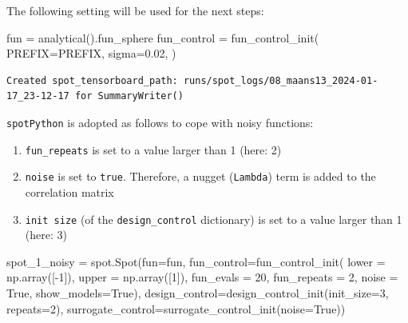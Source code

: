 \documentclass[
  letterpaper,
  DIV=11,
  numbers=noendperiod]{scrreprt}
\newenvironment{Shaded}{\begin{snugshade}}{\end{snugshade}}
\newcommand{\DecValTok}[1]{\textcolor[rgb]{0.68,0.00,0.00}{#1}}
\newcommand{\FloatTok}[1]{\textcolor[rgb]{0.68,0.00,0.00}{#1}}
\newcommand{\NormalTok}[1]{\textcolor[rgb]{0.00,0.23,0.31}{#1}}
\newcommand{\OperatorTok}[1]{\textcolor[rgb]{0.37,0.37,0.37}{#1}}
\newcommand{\VariableTok}[1]{\textcolor[rgb]{0.07,0.07,0.07}{#1}}
\providecommand{\tightlist}{%
  \setlength{\itemsep}{0pt}\setlength{\parskip}{0pt}}\usepackage{longtable,booktabs,array}
\begin{document}
The following setting will be used for the next steps:

\begin{Shaded}
\begin{Highlighting}[]
\NormalTok{fun }\OperatorTok{=}\NormalTok{ analytical().fun\_sphere}
\NormalTok{fun\_control }\OperatorTok{=}\NormalTok{ fun\_control\_init(}
\NormalTok{    PREFIX}\OperatorTok{=}\NormalTok{PREFIX,}
\NormalTok{    sigma}\OperatorTok{=}\FloatTok{0.02}\NormalTok{,}
\NormalTok{)}
\end{Highlighting}
\end{Shaded}

\begin{verbatim}
Created spot_tensorboard_path: runs/spot_logs/08_maans13_2024-01-17_23-12-17 for SummaryWriter()
\end{verbatim}

\texttt{spotPython} is adopted as follows to cope with noisy functions:

\begin{enumerate}
\def\labelenumi{\arabic{enumi}.}
\tightlist
\item
  \texttt{fun\_repeats} is set to a value larger than 1 (here: 2)
\item
  \texttt{noise} is set to \texttt{true}. Therefore, a nugget
  (\texttt{Lambda}) term is added to the correlation matrix
\item
  \texttt{init\ size} (of the \texttt{design\_control} dictionary) is
  set to a value larger than 1 (here: 3)
\end{enumerate}

\begin{Shaded}
\begin{Highlighting}[]
\NormalTok{spot\_1\_noisy }\OperatorTok{=}\NormalTok{ spot.Spot(fun}\OperatorTok{=}\NormalTok{fun,}
\NormalTok{                   fun\_control}\OperatorTok{=}\NormalTok{fun\_control\_init(}
\NormalTok{                                    lower }\OperatorTok{=}\NormalTok{ np.array([}\OperatorTok{{-}}\DecValTok{1}\NormalTok{]),}
\NormalTok{                                    upper }\OperatorTok{=}\NormalTok{ np.array([}\DecValTok{1}\NormalTok{]),}
\NormalTok{                                    fun\_evals }\OperatorTok{=} \DecValTok{20}\NormalTok{,}
\NormalTok{                                    fun\_repeats }\OperatorTok{=} \DecValTok{2}\NormalTok{,}
\NormalTok{                                    noise }\OperatorTok{=} \VariableTok{True}\NormalTok{,}
\NormalTok{                                    show\_models}\OperatorTok{=}\VariableTok{True}\NormalTok{),}
\NormalTok{                   design\_control}\OperatorTok{=}\NormalTok{design\_control\_init(init\_size}\OperatorTok{=}\DecValTok{3}\NormalTok{, repeats}\OperatorTok{=}\DecValTok{2}\NormalTok{),}
\NormalTok{                   surrogate\_control}\OperatorTok{=}\NormalTok{surrogate\_control\_init(noise}\OperatorTok{=}\VariableTok{True}\NormalTok{))}
\end{Highlighting}
\end{Shaded}
\end{document}
